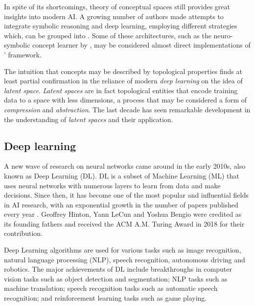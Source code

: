 In spite of its shortcomings, \cite{Gaerdenfors2000} theory of conceptual spaces still provides great insights into modern AI. A growing number of authors made attempts to integrate symbolic reasoning and deep learning, employing different strategies which, can be grouped into . Some of these architectures, such as the neuro-symbolic concept learner by \cite{Mao2019}, may be considered almost direct implementations of \citeauthor{Gaerdenfors2000}' framework.

The intuition that concepts may be described by topological properties finds at least partial confirmation in the reliance of modern \emph{deep learning} on the idea of \emph{latent space}. \emph{Latent spaces} are in fact topological entities that encode training data to a space with less dimensions, a process that may be considered a form of \emph{compression} and \emph{abstraction}. The last decade has seen remarkable development in the understanding of \emph{latent spaces} and their application.

\subsection{Deep learning}\label{sec:deep-learning}

A new wave of research on neural networks came around in the early 2010s, also known as Deep Learning (DL). DL is a subset of Machine Learning (ML) that uses neural networks with numerous layers to learn from data and make decisions. Since then, it has become one of the most popular and influential fields in AI research, with an exponential growth in the number of papers published every year \citep{Krenn2022}. Geoffrey Hinton, Yann LeCun and Yoshua Bengio were credited as its founding fathers and received the ACM A.M. Turing Award in 2018 for their contribution. 

Deep Learning algorithms are used for various tasks such as image recognition, natural language processing (NLP), speech recognition, autonomous driving and robotics. The major achievements of DL include breakthroughs in computer vision tasks such as object detection and segmentation; NLP tasks such as machine translation; speech recognition tasks such as automatic speech recognition; and reinforcement learning tasks such as game playing. 

